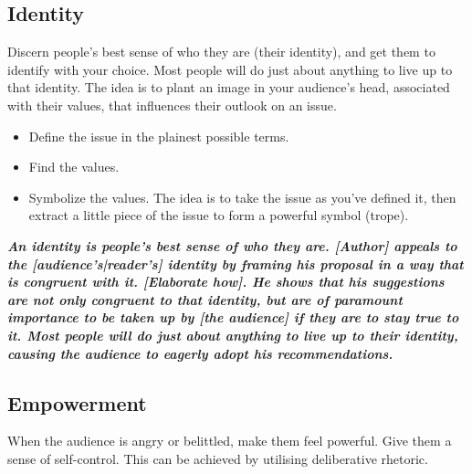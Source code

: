 \subsection{Identity}
Discern people's best sense of who they are (their identity), and get them to identify with your choice. Most people will do just about anything to live up to that identity. The idea is to plant an image in your audience's head, associated with their values, that influences their outlook on an issue.

\begin{itemize}
	\item Define the issue in the plainest possible terms.
	\item Find the values.
	\item Symbolize the values. The idea is to take the issue as you've defined it, then extract a little piece of the issue to form a powerful symbol (trope).
\end{itemize}

\emph{\textbf{An identity is people's best sense of who they are. [Author] appeals to the [audience's|reader's] identity by framing his proposal in a way that is congruent with it. [Elaborate how]. He shows that his suggestions are not only congruent to that identity, but are of paramount importance to be taken up by [the audience] if they are to stay true to it. Most people will do just about anything to live up to their identity, causing the audience to eagerly adopt his recommendations.}}

\subsection{Empowerment}
When the audience is angry or belittled, make them feel powerful. Give them a sense of self-control. This can be achieved by utilising deliberative rhetoric.


